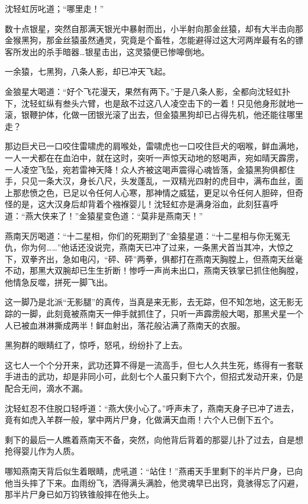 \documentclass[12pt,oneside]{book}
\begin{document}
沈轻虹厉叱道；``哪里走！''

数十点银星，突然自那满天银光中暴射而出，小半射向那金丝猿，却有大半击向那金猴黑狗，那金丝猿虽然通灵，究竟是个畜牲，怎能避得过这大河两岸最有名的镖客所发出的杀手暗器\ldots 银星击出，这灵猿便已惨嗥倒地。

一余猿，七黑狗，八条人影，却已冲天飞起。

金狼星大喝道：``好个飞花漫天，果然有两下。''于是八条人影，全都向沈轻虹扑下，沈轻虹纵有叁头六臂，也是敌不过这八人凌空击下的一着！只见他身形就地一滚，银鞭护体，化做一团银光滚了出去，但金猿黑狗却已占得先机，他还能往哪里走？

那边巨犬已一口咬住雷啸虎的肩喉处，雷啸虎也一口咬住巨犬的咽喉，鲜血满地，一人一犬都在在血泊中，就在这时，突听一声惊天动地的怒喝声，宛如晴天霹雳，一人凌空飞坠，宛若雷神天降！众人齐被这喝声震得心魂皆落，金猿黑狗俱都住手，只见一条大汉，身长八尺，头发蓬乱，一双精光四射的虎目中，满布血丝，面上那悲愤之色，已足以令任何人心寒，那神情之威猛，更足以令任何人胆碎，但奇怪的是，这大汉身后却背着个襁褓婴儿！沈轻虹亦是满身浴血，此刻狂喜呼道：``燕大侠来了！''金猿星变色道：``莫非是燕南天！''

燕南天厉喝道：``十二星相，你们的死期到了''金猿星道：``十二星相与你无冤无仇，你为何\ldots\ldots{}''他话还没说完，燕南天已冲了过来，一条黑犬首当其冲，大惊之下，双拳齐出，急如电闪，``砰、砰''两拳，俱都打在燕南天胸膛上，但燕南天丝毫不动，那黑大双腕却已生生折断！惨呼一声尚未出口，燕南天铁掌已抓住他胸膛，他情急反噬，拼死一脚飞出。

这一脚乃是北派``无影腿''的真传，当真是来无影，去无踪，但不知怎地，这无影无踪的一脚，此刻竟被燕南天一伸手就抓住了，只听一声霹雳般大喝，那黑犬星一个人已被血淋淋撕成两半！鲜血射出，落花般沾满了燕南天的衣服。

黑狗群的眼睛红了，惊呼，怒吼，纷纷扑了上去。

这七人一个个分开来，武功还算不得是一流高手，但七人久共生死，练得有一套联手进击的武功，却是非同小可，此刻七个人虽只剩下六个，但招式发动开来，仍是配合无间，滴水不漏。

沈轻虹忍不住脱口轻呼道：``燕大侠小心了。''呼声未了，燕南天身子已冲了进去，竟有如虎入羊群一般，掌中两片尸身，化做满天血雨！六个人已倒下五个。

剩下的最后一人瞧着燕南天不备，突然，向他背后背着的那婴儿扑了过去，自是想抢得婴儿作为人质。

哪知燕南天背后似生着眼睛，虎吼道：``站住！''燕甫天手里剩下的半片尸身，已向他当头摔了下来。血雨纷飞，洒得满头满脸，他灵魂早已出窍，竟骇得忘了闪避，那半片尸身已如万钧铁锥般摔在他头上。
\end{document}
